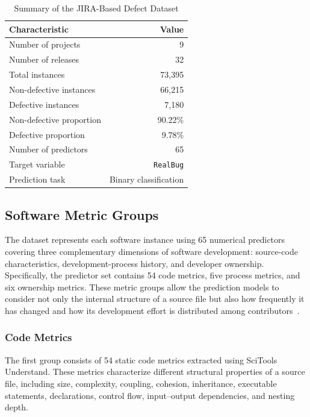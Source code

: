 \documentclass[conference]{IEEEtran}
\begin{document}
\begin{table}[H]
\caption{Summary of the JIRA-Based Defect Dataset}
\label{tab:dataset-summary}
\centering
\begin{tabular}{@{}lr@{}}
\toprule
\textbf{Characteristic} & \textbf{Value} \\
\midrule
Number of projects       & 9 \\
Number of releases       & 32 \\
Total instances          & 73,395 \\
Non-defective instances  & 66,215 \\
Defective instances      & 7,180 \\
Non-defective proportion & 90.22\% \\
Defective proportion     & 9.78\% \\
Number of predictors     & 65 \\
Target variable          & \texttt{RealBug} \\
Prediction task          & Binary classification \\
\bottomrule
\end{tabular}
\end{table}

\subsection{Software Metric Groups}

\label{subsec:metric-groups}

The dataset represents each software instance using 65 numerical
predictors covering three complementary dimensions of software
development: source-code characteristics, development-process history,
and developer ownership. Specifically, the predictor set contains
54 code metrics, five process metrics, and six ownership metrics.
These metric groups allow the prediction models to consider not only
the internal structure of a source file but also how frequently it has
changed and how its development effort is distributed among
contributors~\cite{yatish2019}.

\subsubsection{Code Metrics}

The first group consists of 54 static code metrics extracted using
SciTools Understand. These metrics characterize different structural
properties of a source file, including size, complexity, coupling,
cohesion, inheritance, executable statements, declarations, control
flow, input--output dependencies, and nesting depth.
\end{document}
